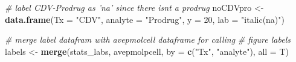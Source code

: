 \documentclass[]{article}
\newenvironment{Shaded}{\begin{snugshade}}{\end{snugshade}}
\newcommand{\CommentTok}[1]{\textcolor[rgb]{0.56,0.35,0.01}{\textit{#1}}}
\newcommand{\DataTypeTok}[1]{\textcolor[rgb]{0.13,0.29,0.53}{#1}}
\newcommand{\DecValTok}[1]{\textcolor[rgb]{0.00,0.00,0.81}{#1}}
\newcommand{\KeywordTok}[1]{\textcolor[rgb]{0.13,0.29,0.53}{\textbf{#1}}}
\newcommand{\NormalTok}[1]{#1}
\newcommand{\StringTok}[1]{\textcolor[rgb]{0.31,0.60,0.02}{#1}}
\begin{document}
\begin{Shaded}
\begin{Highlighting}[]
\CommentTok{# label CDV-Prodrug as 'na' since there isnt a prodrug}
\NormalTok{noCDVpro <-}\StringTok{ }\KeywordTok{data.frame}\NormalTok{(}\DataTypeTok{Tx =} \StringTok{"CDV"}\NormalTok{, }\DataTypeTok{analyte =} \StringTok{"Prodrug"}\NormalTok{, }\DataTypeTok{y =} \DecValTok{20}\NormalTok{, }
    \DataTypeTok{lab =} \StringTok{"italic(na)"}\NormalTok{)}

\CommentTok{# merge label datafram with avepmolcell dataframe for calling}
\CommentTok{# figure labels}
\NormalTok{labels <-}\StringTok{ }\KeywordTok{merge}\NormalTok{(stats_labs, avepmolpcell, }\DataTypeTok{by =} \KeywordTok{c}\NormalTok{(}\StringTok{"Tx"}\NormalTok{, }\StringTok{"analyte"}\NormalTok{), }
    \DataTypeTok{all =}\NormalTok{ T)}
\end{Highlighting}
\end{Shaded}
\end{document}
